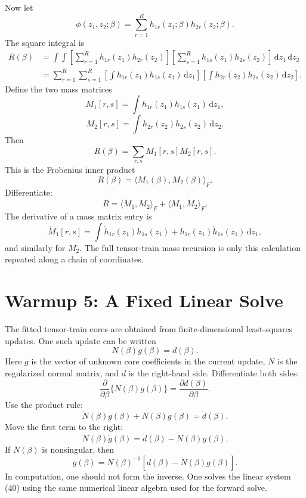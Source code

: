 \documentclass[11pt]{article}
\theoremstyle{remark}
\newcommand{\dd}{\,\mathrm d}
\begin{document}
Now let
\[
    \phi(z_1,z_2;\beta)
    =
    \sum_{r=1}^{R}h_{1r}(z_1;\beta)h_{2r}(z_2;\beta).
    \tag{29}
\]
The square integral is
\[
\begin{aligned}
    R(\beta)
    &=
    \int\!\!\int
    \left[
    \sum_{r=1}^{R}h_{1r}(z_1)h_{2r}(z_2)
    \right]
    \left[
    \sum_{s=1}^{R}h_{1s}(z_1)h_{2s}(z_2)
    \right]
    \dd z_1\dd z_2\\
    &=
    \sum_{r=1}^{R}\sum_{s=1}^{R}
    \left[\int h_{1r}(z_1)h_{1s}(z_1)\dd z_1\right]
    \left[\int h_{2r}(z_2)h_{2s}(z_2)\dd z_2\right].
\end{aligned}
\tag{30}
\]
Define the two mass matrices
\[
    M_1[r,s]=\int h_{1r}(z_1)h_{1s}(z_1)\dd z_1,
    \tag{31}
\]
\[
    M_2[r,s]=\int h_{2r}(z_2)h_{2s}(z_2)\dd z_2.
    \tag{32}
\]
Then
\[
    R(\beta)=\sum_{r,s}M_1[r,s]M_2[r,s].
    \tag{33}
\]
This is the Frobenius inner product
\[
    R(\beta)=\langle M_1(\beta),M_2(\beta)\rangle_F.
    \tag{34}
\]
Differentiate:
\[
    \dot R
    =
    \langle \dot M_1,M_2\rangle_F
    +
    \langle M_1,\dot M_2\rangle_F.
    \tag{35}
\]
The derivative of a mass matrix entry is
\[
    \dot M_1[r,s]
    =
    \int
    \dot h_{1r}(z_1)h_{1s}(z_1)
    +
    h_{1r}(z_1)\dot h_{1s}(z_1)
    \dd z_1,
    \tag{36}
\]
and similarly for \(M_2\).  The full tensor-train mass recursion is only this
calculation repeated along a chain of coordinates.

\section{Warmup 5: A Fixed Linear Solve}

The fitted tensor-train cores are obtained from finite-dimensional least-squares
updates.  One such update can be written
\[
    N(\beta)g(\beta)=d(\beta).
    \tag{37}
\]
Here \(g\) is the vector of unknown core coefficients in the current update,
\(N\) is the regularized normal matrix, and \(d\) is the right-hand side.
Differentiate both sides:
\[
    \frac{\partial}{\partial\beta}\{N(\beta)g(\beta)\}
    =
    \frac{\partial d(\beta)}{\partial\beta}.
    \tag{38}
\]
Use the product rule:
\[
    \dot N(\beta)g(\beta)+N(\beta)\dot g(\beta)=\dot d(\beta).
    \tag{39}
\]
Move the first term to the right:
\[
    N(\beta)\dot g(\beta)=\dot d(\beta)-\dot N(\beta)g(\beta).
    \tag{40}
\]
If \(N(\beta)\) is nonsingular, then
\[
    \dot g(\beta)=
    N(\beta)^{-1}\left[\dot d(\beta)-\dot N(\beta)g(\beta)\right].
    \tag{41}
\]
In computation, one should not form the inverse.  One solves the linear system
(40) using the same numerical linear algebra used for the forward solve.
\end{document}
